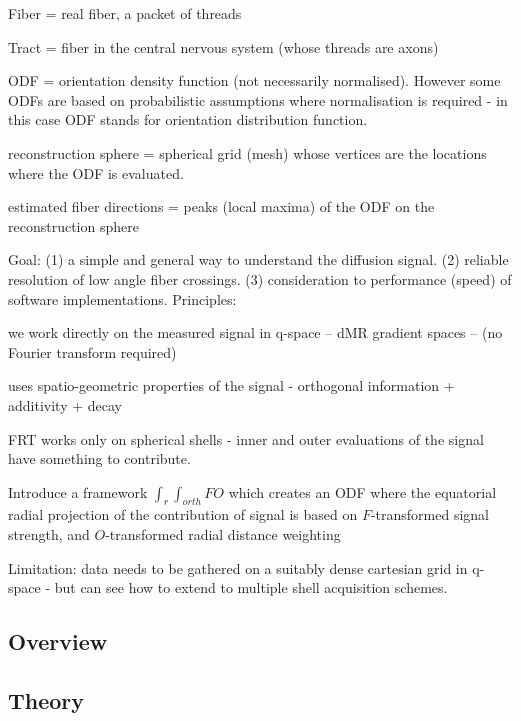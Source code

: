 \documentclass{bioinfo}
\begin{document}
Fiber = real fiber, a packet of threads

Tract = fiber in the central nervous system (whose threads are axons)

ODF = orientation density function (not necessarily normalised). However
some ODFs are based on probabilistic assumptions where normalisation is
required - in this case ODF stands for orientation distribution function.

reconstruction sphere = spherical grid (mesh) whose vertices are the
locations where the ODF is evaluated.

estimated fiber directions = peaks (local maxima) of the ODF on the
reconstruction sphere

Goal: (1) a simple and general way to understand the diffusion
signal. (2) reliable resolution of low angle fiber crossings. (3)
consideration to performance (speed) of software implementations.
Principles:

we work directly on the measured signal in q-space -- dMR gradient
spaces -- (no Fourier transform required)

uses spatio-geometric properties of the signal - orthogonal information
+ additivity + decay

FRT works only on spherical shells - inner and outer evaluations of the
signal have something to contribute.

Introduce a framework $\int_r \int_{orth} F O$ which creates an ODF
where the equatorial radial projection of the contribution of signal is
based on $F$-transformed signal strength, and $O$-transformed radial
distance weighting

Limitation: data needs to be gathered on a suitably dense cartesian grid
in q-space - but can see how to extend to multiple shell acquisition
schemes.


\subsection{Overview}

\subsection{Theory}
\end{document}
